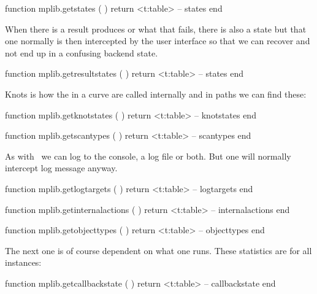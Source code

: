 \starttyping[option=LUA]
function mplib.getstates ( )
    return <t:table> -- states
end
\stoptyping

\startfourrows
\stopfourrows

When there is a result produces or what that fails, there is also a state but that one
normally is then intercepted by the user interface so that we can recover and
not end up in a confusing backend state.

\starttyping[option=LUA]
function mplib.getresultstates ( )
    return <t:table> -- states
end
\stoptyping

\startfourrows
\stopfourrows

Knots is how the  in a curve are called internally and in paths we
can find these:

\starttyping[option=LUA]
function mplib.getknotstates ( )
    return <t:table> -- knotstates
end
\stoptyping

\startfourrows
\stopfourrows

\starttyping[option=LUA]
function mplib.getscantypes ( )
    return <t:table> -- scantypes
end
\stoptyping

\startfourrows
\stopfourrows

As with \TEX\ we can log to the console, a log file or both. But one will normally
intercept log message anyway.

\starttyping[option=LUA]
function mplib.getlogtargets ( )
    return <t:table> -- logtargets
end
\stoptyping

\startfourrows
\stopfourrows

\starttyping[option=LUA]
function mplib.getinternalactions ( )
    return <t:table> -- internalactions
end
\stoptyping

\startfourrows
\stopfourrows

\starttyping[option=LUA]
function mplib.getobjecttypes ( )
    return <t:table> -- objecttypes
end
\stoptyping

\startfourrows
\stopfourrows

The next one is of course dependent on what one runs. These statistics are for
all instances:

\starttyping[option=LUA]
function mplib.getcallbackstate ( )
    return <t:table> -- callbackstate
end
\stoptyping

